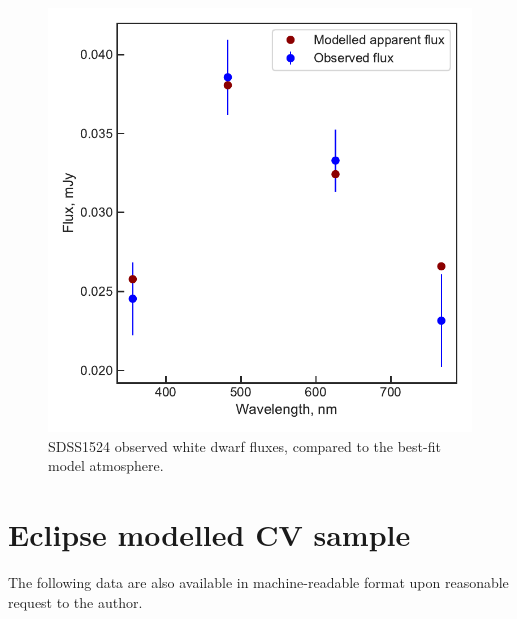 \begin{figure}
    \centering
    \includegraphics[width=\textwidth]{figures/results/SDSS1524/fluxplot.pdf}
    \caption{SDSS1524 observed white dwarf fluxes, compared to the best-fit model atmosphere.}
    \label{fig:SDSS1524 flux plot}
\end{figure}
\clearpage



\section{Eclipse modelled CV sample}
\label{appendix:eclipse modelled CV data tables}

The following data are also available in machine-readable format upon reasonable request to the author.

